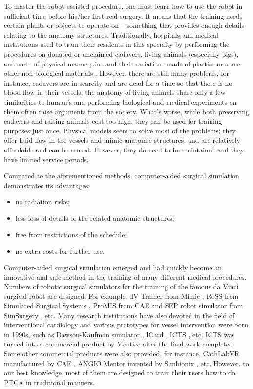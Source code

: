 To master the robot-assisted procedure, one must learn how to use the robot in sufficient time before his/her first real surgery.
It means that the training needs certain plants or objects to operate on -- something that provides enough details relating to the anatomy structures.
Traditionally, hospitals and medical institutions used to train their residents in this specialty by performing the procedures on donated or unclaimed cadavers, living animals (especially pigs), and sorts of physical mannequins and their variations made of plastics or some other non-biological materials \cite{Lunderquist1995,Mori1998}.
However, there are still many problems, for instance, cadavers are in scarcity and are dead for a time so that there is no blood flow in their vessels; the anatomy of living animals share only a few similarities to human's and performing biological and medical experiments on them often raise arguments from the society.
What's worse, while both preserving cadavers and raising animals cost too high, they can be used for training purposes just once.
Physical models seem to solve most of the problems: they offer fluid flow in the vessels and mimic anatomic structures, and are relatively affordable and can be reused.
However, they do need to be maintained and they have limited service periods.

Compared to the aforementioned methods, computer-aided surgical simulation demonstrates its advantages:
\begin{itemize}
\item no radiation risks;
\item less loss of details of the related anatomic structures;
\item free from restrictions of the schedule;
\item no extra costs for further use.
\end{itemize}
Computer-aided surgical simulation emerged and had quickly become an innovative and safe method in the training of many different medical procedures.
Numbers of robotic surgical simulators for the training of the famous da Vinci surgical robot are designed.
For example, dV-Trainer from Mimic \cite{Liss2012}, RoSS from Simulated Surgical Systems \cite{Kesavadas2011}, ProMIS from CAE \cite{Jonsson2011} and SEP robot simulator from SimSurgery \cite{Meijden2010}, etc.
Many research institutions have also devoted in the field of interventional cardiology and various prototypes for vessel intervention were born in 1990s, such as Dawson-Kaufman simulator \cite{Dawson1996DK}, ICard \cite{Wang1997ICard}, ICTS \cite{Cotin2000ICTS}, etc.
ICTS was turned into a commercial product by Mentice \cite{MenticeWeb} after the final work completed.
Some other commercial products were also provided, for instance, CathLabVR manufactured by CAE \cite{CAEWeb}, ANGIO Mentor invented by Simbionix \cite{SimbionixWeb}, etc.
However, to our best knowledge, most of them are designed to train their users how to do PTCA in traditional manners.

